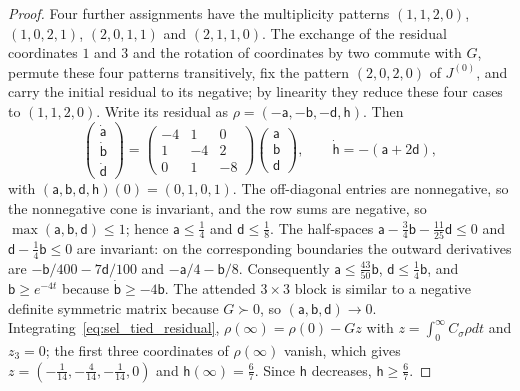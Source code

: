 \begin{proof}
Four further assignments have the multiplicity patterns $(1,1,2,0)$, $(1,0,2,1)$, $(2,0,1,1)$ and $(2,1,1,0)$. The exchange of the residual coordinates $1$ and $3$ and the rotation of coordinates by two commute with $G$, permute these four patterns transitively, fix the pattern $(2,0,2,0)$ of $J^{(0)}$, and carry the initial residual to its negative; by linearity they reduce these four cases to $(1,1,2,0)$. Write its residual as $\rho=(-\mathsf a,-\mathsf b,-\mathsf d,\mathsf h)$. Then
\[
\begin{pmatrix}\dot{\mathsf a}\\\dot{\mathsf b}\\\dot{\mathsf d}\end{pmatrix}
=\begin{pmatrix}-4&1&0\\1&-4&2\\0&1&-8\end{pmatrix}
\begin{pmatrix}\mathsf a\\\mathsf b\\\mathsf d\end{pmatrix},\qquad
\dot{\mathsf h}=-(\mathsf a+2\mathsf d),
\]
with $(\mathsf a,\mathsf b,\mathsf d,\mathsf h)(0)=(0,1,0,1)$. The off-diagonal entries are nonnegative, so the nonnegative cone is invariant, and the row sums are negative, so $\max(\mathsf a,\mathsf b,\mathsf d)\le1$; hence $\mathsf a\le\frac14$ and $\mathsf d\le\frac18$. The half-spaces $\mathsf a-\frac34\mathsf b-\frac{11}{25}\mathsf d\le0$ and $\mathsf d-\frac14\mathsf b\le0$ are invariant: on the corresponding boundaries the outward derivatives are $-\mathsf b/400-7\mathsf d/100$ and $-\mathsf a/4-\mathsf b/8$. Consequently $\mathsf a\le\frac{43}{50}\mathsf b$, $\mathsf d\le\frac14\mathsf b$, and $\mathsf b\ge e^{-4t}$ because $\dot{\mathsf b}\ge-4\mathsf b$. The attended $3\times3$ block is similar to a negative definite symmetric matrix because $G\succ0$, so $(\mathsf a,\mathsf b,\mathsf d)\to0$. Integrating~\eqref{eq:sel_tied_residual}, $\rho(\infty)=\rho(0)-Gz$ with $z=\int_0^\infty C_\sigma\rho dt$ and $z_3=0$; the first three coordinates of $\rho(\infty)$ vanish, which gives $z=(-\frac1{14},-\frac4{14},-\frac1{14},0)$ and $\mathsf h(\infty)=\frac67$. Since $\mathsf h$ decreases, $\mathsf h\ge\frac67$.


\end{proof}
